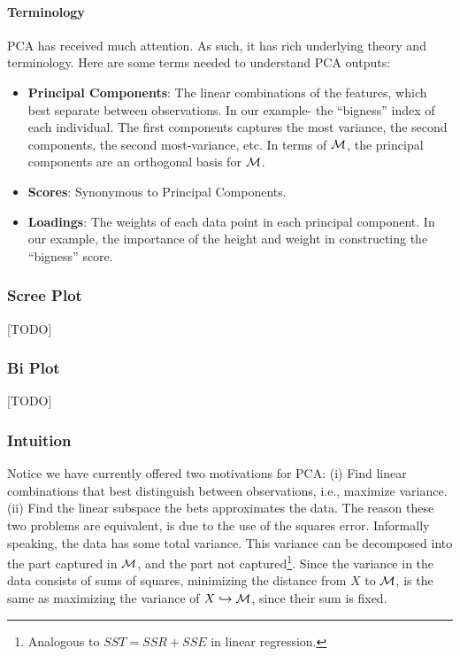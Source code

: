\paragraph{Terminology}
PCA has received much attention. As such, it has rich underlying theory and terminology.
Here are some terms needed to understand PCA outputs:
\begin{itemize}
\item \textbf{Principal Components}:  The linear combinations of the features, which best separate between observations. In our example- the ``bigness'' index of each individual. The first components captures the most variance, the second components, the second most-variance, etc. In terms of $\mathcal{M}$, the principal components are an orthogonal basis for $\mathcal{M}$.
\item \textbf{Scores}: Synonymous to Principal Components.
\item \textbf{Loadings}: The weights of each data point in each principal component. In our example, the importance of the height and weight in constructing the ``bigness'' score.
\end{itemize}


\subsubsection{Scree Plot}
\label{sec:scree_plot}
[TODO]



\subsubsection{Bi Plot}
\label{sec:bi_plot}
[TODO]



\subsubsection{Intuition}
\label{sec:pca_intuition}

Notice we have currently offered two motivations for PCA: 
(i) Find linear combinations that best distinguish between observations, i.e., maximize variance. 
(ii) Find the linear subspace the bets approximates the data.
The reason these two problems are equivalent, is due to the use of the squares error.
Informally speaking, the data has some total variance. This variance can be decomposed into the part captured in $\mathcal{M}$, and the part not captured\footnote{Analogous to $SST=SSR+SSE$ in linear regression.}. 
Since the variance in the data consists of sums of squares, minimizing the distance from $X$ to $\mathcal{M}$, is the same as maximizing the variance of $X \hookrightarrow \mathcal{M}$, since their sum is fixed.



